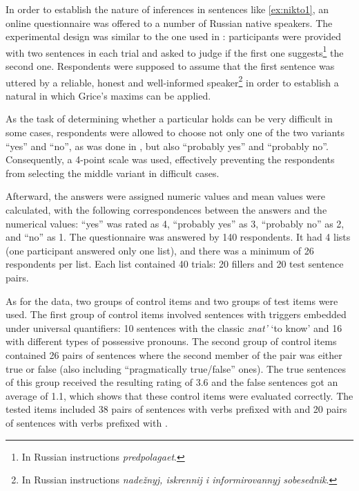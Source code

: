 In order to establish the nature of inferences in sentences like \ref{ex:nikto1}, an online questionnaire was offered to a number of Russian native speakers. The experimental design was similar to the one used in \citealt{Chemla:09}: participants were provided with two sentences in each trial and asked to judge if the first one suggests\footnote{In Russian instructions \textit{predpolagaet}.} the second one. Respondents were supposed to assume that the first sentence was uttered by a reliable, honest and well-informed speaker\footnote{In Russian instructions \textit{nade\v{z}nyj, iskrennij i informirovannyj sobesednik}.} in order to establish a natural  in which Grice's maxims can be applied.

As the task of determining whether a particular  holds can be very difficult in some cases, respondents were allowed to choose not only one of the two variants ``yes'' and ``no'', as was done in \citealt{Chemla:09}, but also ``probably yes'' and ``probably no''. Consequently, a 4-point scale was used, effectively preventing the respondents from selecting the middle variant in difficult cases.

Afterward, the answers were assigned numeric values and mean values were calculated, with the following correspondences between the answers and the numerical values: ``yes'' was rated as 4, ``probably yes'' as 3, ``probably no'' as 2, and ``no'' as 1. The questionnaire was answered by 140 respondents. It had 4 lists (one participant answered only one list), and there was a minimum of 26 respondents per list. Each list contained 40 trials: 20 fillers and 20 test sentence pairs.

As for the data, two groups of control items and two groups of test items were used. The first group of control items involved sentences with  triggers embedded under universal quantifiers: 10 sentences with the classic  \textit{znat'} `to know' and 16 with different types of possessive pronouns. The second group of control items contained 26 pairs of sentences where the second member of the pair was either true or false (also including ``pragmatically true/false'' ones). The true sentences of this group received the resulting rating of 3.6 and the false sentences got an average of 1.1, which shows that these control items were evaluated correctly. The tested items included 38 pairs of sentences with verbs prefixed with  and 20 pairs of sentences with verbs prefixed with .

